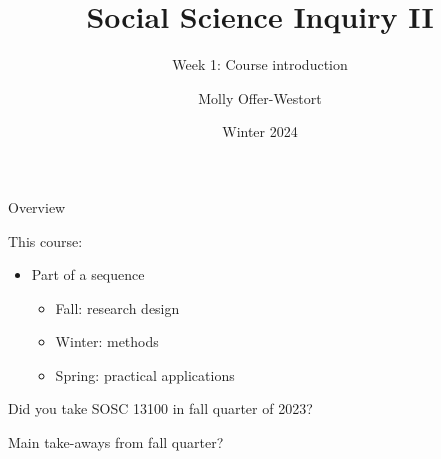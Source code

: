 \documentclass[xcolor={dvipsnames}]{beamer}
\title{Social Science Inquiry II}
\subtitle{Week 1: Course introduction}
\date{Winter 2024}
\author{Molly Offer-Westort}
\institute{Department of Political Science, \\University of Chicago}
\begin{document}


\frame{\titlepage
\thispagestyle{empty}
}
\begin{frame}{Overview}

This course:\pause
\begin{itemize}
\item Part of a sequence \pause
\begin{itemize}
\item Fall: research design \pause
\item Winter: methods \pause
\item Spring: practical applications
\end{itemize}
\end{itemize}

\pause

Did you take SOSC 13100 in fall quarter of 2023?

\end{frame}



\begin{frame}

\begin{center}
Main take-aways from fall quarter?
\end{center}

\end{frame}



\end{document}
